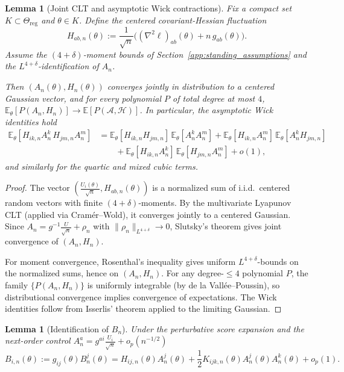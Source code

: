 \documentclass[11pt,letterpaper]{amsart}
\newcommand{\E}{\mathbb{E}}
\numberwithin{equation}{section}
\theoremstyle{plain}
\newtheorem{lemma}[theorem]{Lemma}
\theoremstyle{definition}
\theoremstyle{remark}
\begin{document}
\begin{lemma}[Joint CLT and asymptotic Wick contractions]\label{lem:joint_clt_wick}
Fix a compact set \(K\subset \Theta_{\mathrm{reg}}\) and \(\theta\in K\). Define the centered covariant-Hessian fluctuation
\[
H_{ab,n}(\theta)
:=
\frac{1}{\sqrt n}\Big((\nabla^2\ell)_{ab}(\theta)+n\,g_{ab}(\theta)\Big).
\]
Assume the $(4+\delta)$-moment bounds of Section~\ref{app:standing_assumptions} and the $L^{4+\delta}$-identification of $A_n$.

Then $(A_n(\theta),H_n(\theta))$ converges jointly in distribution to a centered Gaussian vector, and for every polynomial $P$ of total degree at most $4$,
$\E_\theta[P(A_n,H_n)] \to \E[P(\mathcal{A},\mathcal{H})]$.
In particular, the asymptotic Wick identities hold
\begin{align*}
\E_\theta[H_{ik,n}A_n^k\,H_{jm,n}A_n^m]
&=
\E_\theta[H_{ik,n}H_{jm,n}]\,\E_\theta[A_n^kA_n^m]
+\E_\theta[H_{ik,n}A_n^m]\,\E_\theta[A_n^kH_{jm,n}]
\\
&\qquad
+\E_\theta[H_{ik,n}A_n^k]\,\E_\theta[H_{jm,n}A_n^m]
+o(1),
\end{align*}
and similarly for the quartic and mixed cubic terms.
\end{lemma}

\begin{proof}
The vector $\left(\frac{U_i(\theta)}{\sqrt n}, H_{ab,n}(\theta)\right)$ is a normalized sum of i.i.d.\ centered random vectors with finite $(4+\delta)$-moments. By the multivariate Lyapunov CLT (applied via Cram\'er--Wold), it converges jointly to a centered Gaussian. Since $A_n = g^{-1}\frac{U}{\sqrt n} + \rho_n$ with $\|\rho_n\|_{L^{4+\delta}} \to 0$, Slutsky's theorem gives joint convergence of $(A_n, H_n)$.

For moment convergence, Rosenthal's inequality gives uniform $L^{4+\delta}$-bounds on the normalized sums, hence on $(A_n, H_n)$. For any degree-$\le 4$ polynomial $P$, the family $\{P(A_n,H_n)\}$ is uniformly integrable (by de la Vall\'ee--Poussin), so distributional convergence implies convergence of expectations. The Wick identities follow from Isserlis' theorem applied to the limiting Gaussian.
\end{proof}


\begin{lemma}[Identification of \(B_n\)]
\label{lem:B_identification}
Under the perturbative score expansion and the next-order control $A_n^a=g^{ai}\frac{U_i}{\sqrt n}+o_p(n^{-1/2})$
\[
B_{i,n}(\theta)
:= g_{ij}(\theta)B_n^j(\theta)
=
H_{ij,n}(\theta)A_n^j(\theta)
+\frac12 K_{ijk,n}(\theta)A_n^j(\theta)A_n^k(\theta)
+o_p(1).
\]
\end{lemma}
\end{document}
